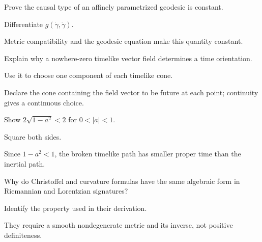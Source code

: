 \begin{exercise}\label{exr:vii30-ped-06}
Prove the causal type of an affinely parametrized geodesic is constant.
\end{exercise}

\begin{hint}
Differentiate \(g(\dot\gamma,\dot\gamma)\).
\end{hint}

\begin{solution}
Metric compatibility and the geodesic equation make this quantity constant.
\end{solution}

\begin{exercise}\label{exr:vii30-ped-07}
Explain why a nowhere-zero timelike vector field determines a time orientation.
\end{exercise}

\begin{hint}
Use it to choose one component of each timelike cone.
\end{hint}

\begin{solution}
Declare the cone containing the field vector to be future at each point; continuity gives a continuous choice.
\end{solution}

\begin{exercise}\label{exr:vii30-ped-08}
Show \(2\sqrt{1-a^2}<2\) for \(0<|a|<1\).
\end{exercise}

\begin{hint}
Square both sides.
\end{hint}

\begin{solution}
Since \(1-a^2<1\), the broken timelike path has smaller proper time than the inertial path.
\end{solution}

\begin{exercise}\label{exr:vii30-ped-09}
Why do Christoffel and curvature formulas have the same algebraic form in Riemannian and Lorentzian signatures?
\end{exercise}

\begin{hint}
Identify the property used in their derivation.
\end{hint}

\begin{solution}
They require a smooth nondegenerate metric and its inverse, not positive definiteness.
\end{solution}

